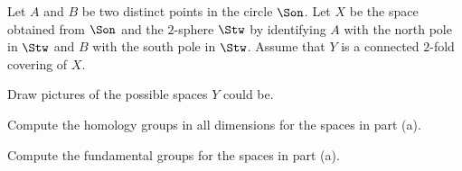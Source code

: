 Let $A$ and $B$ be two distinct points in the circle $\Son$. Let $X$
be the space obtained from $\Son$ and the $2$-sphere $\Stw$ by
identifying $A$ with the north pole in $\Stw$ and $B$ with the south
pole in $\Stw$. Assume that $Y$ is a connected $2$-fold covering of
$X$.
\begin{alist}
\item Draw pictures of the possible spaces $Y$ could be.
\item Compute the homology groups in all dimensions for the spaces in
part (a).
\item Compute the fundamental groups for the spaces in part (a).
\end{alist}
